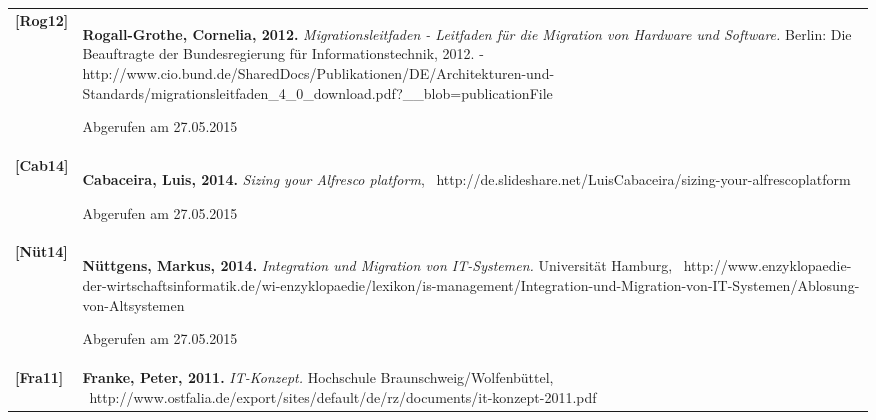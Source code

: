 \documentclass[a4paper]{article}
\begin{document}
\begin{flushleft}
\tablefirsthead{}
\tablehead{}
\tabletail{}
\tablelasttail{}
\begin{supertabular}{m{1.6999999cm}m{13.269cm}}
{\sffamily \textbf{[Rog12]}} &
{\sffamily \textbf{Rogall-Grothe, Cornelia, 2012. }\textit{Migrationsleitfaden - Leitfaden für die Migration von
Hardware und Software.} Berlin: Die Beauftragte der Bundesregierung für Informationstechnik, 2012. -
http://www.cio.bund.de/SharedDocs/Publikationen/DE/Architekturen-und-Standards/migrationsleitfaden\_4\_0\_download.pdf?\_\_blob=publicationFile}

{\sffamily Abgerufen am 27.05.2015}\\
{\sffamily\bfseries [Cab14]} &
{\sffamily \textbf{Cabaceira, Luis, 2014. }\textit{Sizing your Alfresco platform},
\ http://de.slideshare.net/LuisCabaceira/sizing-your-alfrescoplatform}

{\sffamily Abgerufen am 27.05.2015}\\
{\sffamily\bfseries [Nüt14]} &
{\sffamily \textbf{Nüttgens, Markus, 2014. }\textit{Integration und Migration von IT-Systemen.} Universität Hamburg,
\ http://www.enzyklopaedie-der-wirtschaftsinformatik.de/wi-enzyklopaedie/lexikon/is-management/Integration-und-Migration-von-IT-Systemen/Ablosung-von-Altsystemen}

{\sffamily Abgerufen am 27.05.2015}\\
{\sffamily\bfseries [Fra11]} &
{\sffamily \textbf{Franke, Peter, 2011. }\textit{IT-Konzept.} Hochschule Braunschweig/Wolfenbüttel,
\ http://www.ostfalia.de/export/sites/default/de/rz/documents/it-konzept-2011.pdf}


\end{supertabular}
\end{flushleft}
\end{document}
